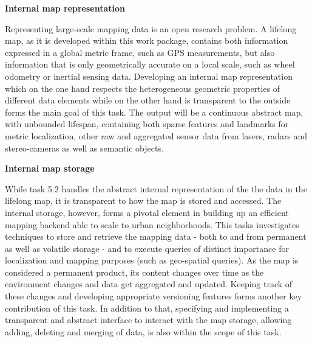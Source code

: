 {\begin{tasks}{\WPMappingNo}


\item  {\bf Internal map representation}
\label{task:wpmaloc:internalmaprepresenation}
\taskpartners{\ETHZ}{\IBM}

Representing large-scale mapping data is an open research problem. A lifelong map, as it is developed within this work package, contains both information expressed in a global metric frame, such as GPS measurements, but also information that is only geometrically accurate on a local scale, such as wheel odometry or inertial sensing data. Developing an internal map representation which on the one hand respects the heterogeneous geometric properties of different data elements while on the other hand is transparent to the outside forms the main goal of this task. The output will be a continuous abstract map, with unbounded lifespan, containing both sparse features and landmarks for metric localization, other raw and aggregated sensor data from lasers, radars and stereo-cameras as well as semantic objects.




\item {\bf Internal map storage}
\label{task:wpcloud:6}
\taskpartners{\IBM}{\ETHZ}

While task 5.2 handles the abstract internal representation of the the data in the lifelong map, it is transparent to how the map is stored and accessed. The internal storage, however, forms a pivotal element in building up an efficient mapping backend able to scale to urban neighborhoods. This tasks investigates techniques to store and retrieve the mapping data - both to and from permanent as well as volatile storage - and to execute queries of distinct importance for localization and mapping purposes (such as geo-spatial queries). As the map is considered a permanent product, its content changes over time as the environment changes and data get aggregated and updated. Keeping track of these changes and developing appropriate versioning features forms another key contribution of this task. In addition to that, specifying and implementing a transparent and abstract interface to interact with the map storage, allowing adding, deleting and merging of data, is also within the scope of this task.


\end{tasks}}
